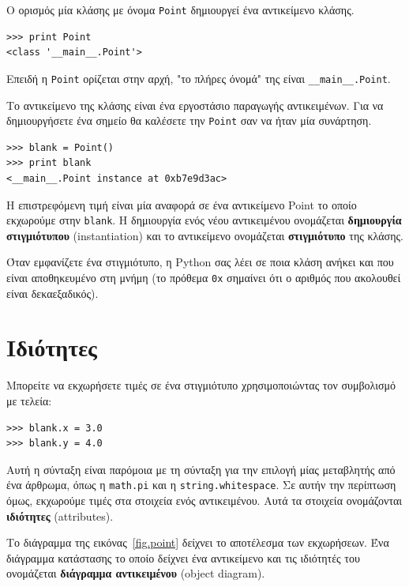 \documentclass[10pt]{book}
\begin{document}
Ο ορισμός μία κλάσης με όνομα {\tt Point} δημιουργεί ένα αντικείμενο κλάσης. 

\begin{verbatim}
>>> print Point
<class '__main__.Point'>
\end{verbatim}
%
Επειδή η {\tt Point} ορίζεται στην αρχή, "το πλήρες όνομά" της είναι \verb"__main__.Point".

Το αντικείμενο της κλάσης είναι ένα εργοστάσιο παραγωγής αντικειμένων. Για να δημιουργήσετε ένα σημείο
θα καλέσετε την {\tt Point} σαν να ήταν μία συνάρτηση. 

\begin{verbatim}
>>> blank = Point()
>>> print blank
<__main__.Point instance at 0xb7e9d3ac>
\end{verbatim}
%
Η επιστρεφόμενη τιμή είναι μία αναφορά σε ένα αντικείμενο Point το οποίο εκχωρούμε στην {\tt blank}.
Η δημιουργία ενός νέου αντικειμένου ονομάζεται {\bf δημιουργία στιγμιότυπου} (instantiation) και το
αντικείμενο ονομάζεται {\bf στιγμιότυπο} της κλάσης.

Όταν εμφανίζετε ένα στιγμιότυπο, η Python σας λέει σε ποια κλάση ανήκει και που είναι αποθηκευμένο στη μνήμη
(το πρόθεμα {\tt 0x} σημαίνει ότι ο αριθμός που ακολουθεί είναι δεκαεξαδικός).


\section{Ιδιότητες}
\label{attributes}

Μπορείτε να εκχωρήσετε τιμές σε ένα στιγμιότυπο χρησιμοποιώντας τον συμβολισμό με τελεία:

\begin{verbatim}
>>> blank.x = 3.0
>>> blank.y = 4.0
\end{verbatim}
%
Αυτή η σύνταξη είναι παρόμοια με τη σύνταξη για την επιλογή μίας μεταβλητής από ένα άρθρωμα, όπως η {\tt math.pi}
και η {\tt string.whitespace}. Σε αυτήν την περίπτωση όμως, εκχωρούμε τιμές στα στοιχεία ενός αντικειμένου.
Αυτά τα στοιχεία ονομάζονται {\bf ιδιότητες} (attributes).


Το διάγραμμα της εικόνας~\ref{fig.point} δείχνει το αποτέλεσμα των εκχωρήσεων. Ένα διάγραμμα κατάστασης το οποίο
δείχνει ένα αντικείμενο και τις ιδιότητές του ονομάζεται {\bf διάγραμμα αντικειμένου} (object diagram). 
\end{document}
